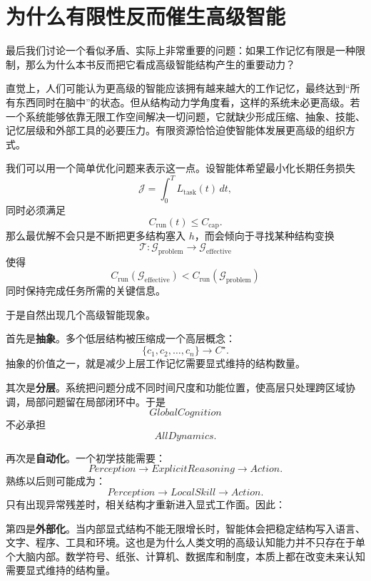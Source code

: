 \section{为什么有限性反而催生高级智能}
\label{sec:finiteness-drives-intelligence}

最后我们讨论一个看似矛盾、实际上非常重要的问题：如果工作记忆有限是一种限制，那么为什么本书反而把它看成高级智能结构产生的重要动力？

直觉上，人们可能认为更高级的智能应该拥有越来越大的工作记忆，最终达到“所有东西同时在脑中”的状态。但从结构动力学角度看，这样的系统未必更高级。若一个系统能够依靠无限工作空间解决一切问题，它就缺少形成压缩、抽象、技能、记忆层级和外部工具的必要压力。有限资源恰恰迫使智能体发展更高级的组织方式。

我们可以用一个简单优化问题来表示这一点。设智能体希望最小化长期任务损失
\[
\mathcal J
=
\int_0^T
L_{\mathrm{task}}(t)\,dt,
\]
同时必须满足
\[
C_{\mathrm{run}}(t)
\leq
C_{\mathrm{cap}}.
\]
那么最优解不会只是不断把更多结构塞入 $h$，而会倾向于寻找某种结构变换
\[
\mathcal T:
\mathcal G_{\mathrm{problem}}
\rightarrow
\mathcal G_{\mathrm{effective}}
\]
使得
\[
C_{\mathrm{run}}
\left(
\mathcal G_{\mathrm{effective}}
\right)
<
C_{\mathrm{run}}
\left(
\mathcal G_{\mathrm{problem}}
\right)
\]
同时保持完成任务所需的关键信息。

于是自然出现几个高级智能现象。

首先是\textbf{抽象}。多个低层结构被压缩成一个高层概念：
\[
\{c_1,c_2,\ldots,c_n\}
\rightarrow
C^\star.
\]
抽象的价值之一，就是减少上层工作记忆需要显式维持的结构数量。

其次是\textbf{分层}。系统把问题分成不同时间尺度和功能位置，使高层只处理跨区域协调，局部问题留在局部闭环中。于是
\[
GlobalCognition
\]
不必承担
\[
AllDynamics.
\]

再次是\textbf{自动化}。一个初学技能需要：
\[
Perception
\rightarrow
ExplicitReasoning
\rightarrow
Action.
\]
熟练以后则可能成为：
\[
Perception
\rightarrow
LocalSkill
\rightarrow
Action.
\]
只有出现异常残差时，相关结构才重新进入显式工作面。因此：
\begin{statementbox}
\centering
{}
\end{statementbox}

第四是\textbf{外部化}。当内部显式结构不能无限增长时，智能体会把稳定结构写入语言、文字、程序、工具和环境。这也是为什么人类文明的高级认知能力并不只存在于单个大脑内部。数学符号、纸张、计算机、数据库和制度，本质上都在改变未来认知需要显式维持的结构量。

